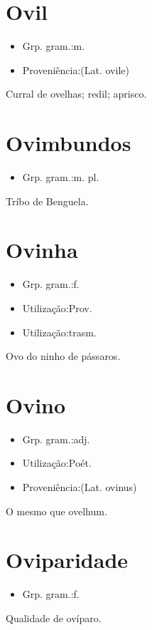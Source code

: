 \section{Ovil}
\begin{itemize}
\item {Grp. gram.:m.}
\end{itemize}
\begin{itemize}
\item {Proveniência:(Lat. \textunderscore ovile\textunderscore )}
\end{itemize}
Curral de ovelhas; redil; aprisco.
\section{Ovimbundos}
\begin{itemize}
\item {Grp. gram.:m. pl.}
\end{itemize}
Tríbo de Benguela.
\section{Ovinha}
\begin{itemize}
\item {Grp. gram.:f.}
\end{itemize}
\begin{itemize}
\item {Utilização:Prov.}
\end{itemize}
\begin{itemize}
\item {Utilização:trasm.}
\end{itemize}
Ovo do ninho de pássaros.
\section{Ovino}
\begin{itemize}
\item {Grp. gram.:adj.}
\end{itemize}
\begin{itemize}
\item {Utilização:Poét.}
\end{itemize}
\begin{itemize}
\item {Proveniência:(Lat. \textunderscore ovinus\textunderscore )}
\end{itemize}
O mesmo que \textunderscore ovelhum\textunderscore .
\section{Oviparidade}
\begin{itemize}
\item {Grp. gram.:f.}
\end{itemize}
Qualidade de ovíparo.
